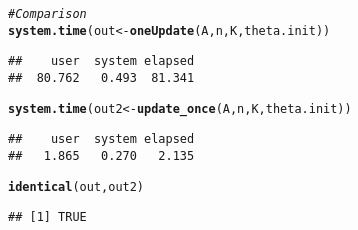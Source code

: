 \documentclass{article}\usepackage[]{graphicx}\usepackage[]{color}
\makeatletter
\newcommand{\hlcom}[1]{\textcolor[rgb]{0.678,0.584,0.686}{\textit{#1}}}%
\newcommand{\hlstd}[1]{\textcolor[rgb]{0.345,0.345,0.345}{#1}}%
\newcommand{\hlkwb}[1]{\textcolor[rgb]{0.69,0.353,0.396}{#1}}%
\newcommand{\hlkwd}[1]{\textcolor[rgb]{0.737,0.353,0.396}{\textbf{#1}}}%
\newenvironment{kframe}{%
 \def\at@end@of@kframe{}%
 \ifinner\ifhmode%
  \def\at@end@of@kframe{\end{minipage}}%
  \begin{minipage}{\columnwidth}%
 \fi\fi%
 \def\FrameCommand##1{\hskip\@totalleftmargin \hskip-\fboxsep
 \colorbox{shadecolor}{##1}\hskip-\fboxsep
     \hskip-\linewidth \hskip-\@totalleftmargin \hskip\columnwidth}%
 \MakeFramed {\advance\hsize-\width
   \@totalleftmargin\z@ \linewidth\hsize
   \@setminipage}}%
 {\par\unskip\endMakeFramed%
 \at@end@of@kframe}
\newenvironment{knitrout}{}{} %
\makeatother
\begin{document}
\begin{knitrout}
\begin{kframe}
\begin{alltt}
\hlcom{# Comparison}
\hlkwd{system.time}\hlstd{(out} \hlkwb{<-} \hlkwd{oneUpdate}\hlstd{(A, n, K, theta.init))}
\end{alltt}
\begin{verbatim}
##    user  system elapsed 
##  80.762   0.493  81.341
\end{verbatim}
\begin{alltt}
\hlkwd{system.time}\hlstd{(out2} \hlkwb{<-} \hlkwd{update_once}\hlstd{(A, n, K, theta.init))}
\end{alltt}
\begin{verbatim}
##    user  system elapsed 
##   1.865   0.270   2.135
\end{verbatim}
\begin{alltt}
\hlkwd{identical}\hlstd{(out, out2)}
\end{alltt}
\begin{verbatim}
## [1] TRUE
\end{verbatim}
\end{kframe}
\end{knitrout}
\end{document}
